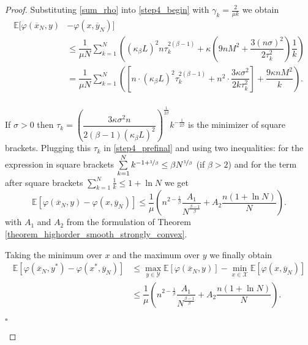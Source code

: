 \documentclass[runningheads]{llncs}
\newcommand{\EndProof}{\begin{flushright}$\square$\end{flushright}}
\newcommand{\E}{{\mathbb E}}
\def\E{\mathbb E}
\begin{document}
\begin{proof}
Substituting \eqref{sum_rho} into \eqref{step4_begin} with $\gamma_k = \frac{2}{\mu k}$ we obtain 
\begin{equation}\label{step4_prefinal}
\begin{split}
    \mathbb{E}  [ \varphi\left(\overline{x}_N , y\right)& - \varphi\left(x, \overline{y}_N\right) ]  \\
    &\leq \dfrac{1}{\mu N} \sum_{k=1}^N   \left((\kappa_{\beta} L)^2 n \tau_k^{2(\beta-1)} 
    + \kappa \left(9 n M^2  + \dfrac{3(n\sigma)^2}{2\tau_k^2} \right) \dfrac{1}{k} \right)\\
    &= \dfrac{1}{\mu N} \sum_{k=1}^N \left( \left[n \cdot (\kappa_{\beta} L)^2 \tau_k^{2(\beta-1)} +
     n^2 \cdot \dfrac{3\kappa \sigma^2}{2k\tau_k^2} \right] +  \dfrac{9 \kappa n M^2}{k}\right).\\
\end{split}
\end{equation}

If $\sigma > 0$ then $\tau_k = {\left(\dfrac{3\kappa \sigma^2 n}{2(\beta -1)(\kappa_{\beta} L)^2}\right)}^{\frac{1}{2\beta}} k^{-\frac{1}{2\beta}}$ is the minimizer of square brackets. Plugging this $\tau_k$ in \eqref{step4_prefinal} and using two inequalities: for the expression in square brackets $\sum\limits_{k=1}^N k^{-1+\nicefrac{1}{\beta}} \leq \beta N^{\nicefrac{1}{\beta}}$ (if $\beta > 2$) and for the term after square brackets $\sum\limits_{k=1}^{N} \frac{1}{k} \leq 1 + \ln N$ we get
\begin{equation*}
    \mathbb{E}  [ \varphi\left(\overline{x}_N , y\right) - \varphi\left(x, \overline{y}_N\right) ] \leq \dfrac{1}{\mu} \left(n^{2-\frac{1}{\beta}}\dfrac{A_1}{N^{\frac{\beta-1}{\beta}}}+A_2\dfrac{n(1+\ln{N})}{N} \right).
\end{equation*}
with $A_1$ and $A_2$ from the formulation of Theorem \ref{theorem_highorder_smooth_strongly_convex}. 

Taking the minimum over $x$ and the maximum over $y$ we finally obtain
\begin{equation*}
\begin{split}
    \E \left[ \varphi(\overline{x}_N, y^*) - \varphi(x^*, \overline{y}_N) \right] &\leq \max_{y\in \mathcal{Y}} \E \left[\varphi(\overline{x}_N, y)  \right] -
    \min_{x\in \mathcal{X}}\E \left[\varphi(x, \overline{y}_N) \right] \\
    &\leq \dfrac{1}{\mu} \left(n^{2-\frac{1}{\beta}}\dfrac{A_1}{N^{\frac{\beta-1}{\beta}}}+A_2\dfrac{n(1+\ln N)}{N} \right).
\end{split}
\end{equation*}
\EndProof
\end{proof}
\end{document}
